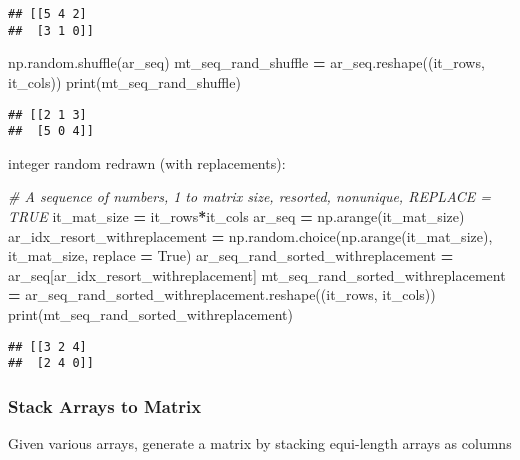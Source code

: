 \documentclass[
]{book}
\newenvironment{Shaded}{\begin{snugshade}}{\end{snugshade}}
\newcommand{\BuiltInTok}[1]{#1}
\newcommand{\CommentTok}[1]{\textcolor[rgb]{0.56,0.35,0.01}{\textit{#1}}}
\newcommand{\NormalTok}[1]{#1}
\newcommand{\OperatorTok}[1]{\textcolor[rgb]{0.81,0.36,0.00}{\textbf{#1}}}
\newcommand{\VariableTok}[1]{\textcolor[rgb]{0.00,0.00,0.00}{#1}}
\begin{document}
\begin{verbatim}
## [[5 4 2]
##  [3 1 0]]
\end{verbatim}

\begin{Shaded}
\begin{Highlighting}[]
\NormalTok{np.random.shuffle(ar\_seq)}
\NormalTok{mt\_seq\_rand\_shuffle }\OperatorTok{=}\NormalTok{ ar\_seq.reshape((it\_rows, it\_cols))}
\BuiltInTok{print}\NormalTok{(mt\_seq\_rand\_shuffle)}
\end{Highlighting}
\end{Shaded}

\begin{verbatim}
## [[2 1 3]
##  [5 0 4]]
\end{verbatim}

integer random redrawn (with replacements):

\begin{Shaded}
\begin{Highlighting}[]
\CommentTok{\# A sequence of numbers, 1 to matrix size, resorted, nonunique, REPLACE = TRUE}
\NormalTok{it\_mat\_size }\OperatorTok{=}\NormalTok{ it\_rows}\OperatorTok{*}\NormalTok{it\_cols}
\NormalTok{ar\_seq }\OperatorTok{=}\NormalTok{ np.arange(it\_mat\_size)}
\NormalTok{ar\_idx\_resort\_withreplacement }\OperatorTok{=}\NormalTok{ np.random.choice(np.arange(it\_mat\_size), it\_mat\_size, replace }\OperatorTok{=} \VariableTok{True}\NormalTok{)}
\NormalTok{ar\_seq\_rand\_sorted\_withreplacement }\OperatorTok{=}\NormalTok{ ar\_seq[ar\_idx\_resort\_withreplacement]}
\NormalTok{mt\_seq\_rand\_sorted\_withreplacement }\OperatorTok{=}\NormalTok{ ar\_seq\_rand\_sorted\_withreplacement.reshape((it\_rows, it\_cols))}
\BuiltInTok{print}\NormalTok{(mt\_seq\_rand\_sorted\_withreplacement)}
\end{Highlighting}
\end{Shaded}

\begin{verbatim}
## [[3 2 4]
##  [2 4 0]]
\end{verbatim}

\hypertarget{stack-arrays-to-matrix}{%
\subsubsection{Stack Arrays to Matrix}\label{stack-arrays-to-matrix}}

Given various arrays, generate a matrix by stacking equi-length arrays as columns
\end{document}

